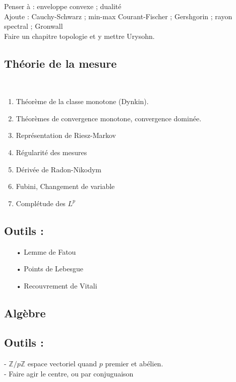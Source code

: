 \documentclass[11pt,a4paper]{article}
\begin{document}
Penser à : enveloppe convexe ; dualité \\
Ajoute : Cauchy-Schwarz ; min-max Courant-Fischer ; Gershgorin ; rayon spectral ; Gronwall \\
Faire un chapitre topologie et y mettre Urysohn.


\newpage
\begin{center}
\section*{Théorie de la mesure} 
\end{center}
~\\
\begin{enumerate}
\item Théorème de la classe monotone (Dynkin).
\item Théorèmes de convergence monotone, convergence dominée.
\item Représentation de Riesz-Markov
\item Régularité des mesures
\item Dérivée de Radon-Nikodym
\item Fubini, Changement de variable
\item Complétude des $\displaystyle L^p$
\end{enumerate}


\subsection*{Outils :}
\begin{itemize}
\item[•] Lemme de Fatou
\item[•] Points de Lebesgue
\item[•] Recouvrement de Vitali
\end{itemize}



\newpage
\begin{center}
\section*{Algèbre} 
\end{center}

\subsection*{Outils :}
- $\mathbb{Z}/p\mathbb{Z}$ espace vectoriel quand $p$ premier et abélien. \\
- Faire agir le centre, ou par conjuguaison
\end{document}

